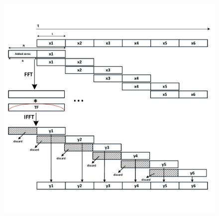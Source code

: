 \documentclass[a4paper]{article}
\begin{document}
\begin{figure}[h]
    \centering
    \includegraphics[width=15cm]{overlap-savev2}
\end{figure}
\end{document}
